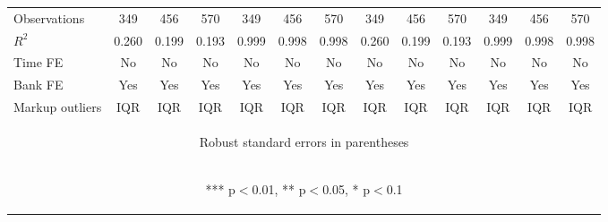 \documentclass[]{article}
\begin{document}
\begin{center}
\begin{tabular}{lcccccccccccc}
Observations & 349 & 456 & 570 & 349 & 456 & 570 & 349 & 456 & 570 & 349 & 456 & 570 \\
$R^2$ & 0.260 & 0.199 & 0.193 & 0.999 & 0.998 & 0.998 & 0.260 & 0.199 & 0.193 & 0.999 & 0.998 & 0.998 \\
Time FE & No & No & No & No & No & No & No & No & No & No & No & No \\
Bank FE & Yes & Yes & Yes & Yes & Yes & Yes & Yes & Yes & Yes & Yes & Yes & Yes \\
 Markup outliers & IQR & IQR & IQR & IQR & IQR & IQR & IQR & IQR & IQR & IQR & IQR & IQR \\ \hline
\multicolumn{13}{c}{\begin{footnotesize} Robust standard errors in parentheses\end{footnotesize}} \\
\multicolumn{13}{c}{\begin{footnotesize} *** p$<$0.01, ** p$<$0.05, * p$<$0.1\end{footnotesize}} \\
\end{tabular}
\end{center}
\end{document}
